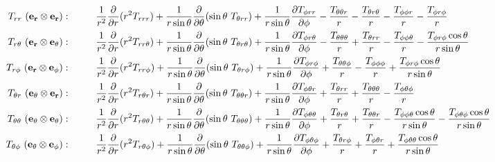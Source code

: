 \documentclass[11pt]{article}
\newcommand{\dr}{\frac{\partial}{\partial r}}
\begin{document}
\begin{landscape}
\newpage

\begin{align}
T_{rr} \ ({\bf{e_r \otimes e_r}}): & \hspace{1cm} \frac{1}{r^2}\dr (r^2 T_{rrr}) + \frac{1}{r\sin{\theta}}\frac{\partial}{\partial \theta} (\sin{\theta} \ T_{\theta rr}) + \frac{1}{r\sin{\theta}}\frac{\partial T_{\phi rr}}{\partial \phi} - \frac{T_{\theta\theta r}}{r} - \frac{T_{\theta r \theta}}{r} -\frac{T_{\phi\phi r}}{r} - \frac{T_{\phi r \phi}}{r} \\
T_{r\theta} \ ({\bf{e_r \otimes e_\theta}}): & \hspace{1cm} \frac{1}{r^2}\dr (r^2 T_{rr \theta}) + \frac{1}{r\sin{\theta}}\frac{\partial}{\partial \theta} (\sin{\theta} \ T_{\theta r \theta}) + \frac{1}{r\sin{\theta}}\frac{\partial T_{\phi r \theta}}{\partial \phi} - \frac{T_{\theta \theta \theta}}{r} + \frac{T_{\theta rr}}{r} - \frac{T_{\phi \phi \theta}}{r} - \frac{T_{\phi r \phi} \cos{\theta}}{r\sin{\theta}} \\
T_{r \phi} \ ({\bf{e_r \otimes e_\phi}}): & \hspace{1cm} \frac{1}{r^2}\dr (r^2 T_{rr \phi}) + \frac{1}{r\sin{\theta}}\frac{\partial}{\partial \theta} (\sin{\theta} \ T_{\theta r \phi}) + \frac{1}{r\sin{\theta}}\frac{\partial T_{\phi r \phi}}{\partial \phi} + \frac{T_{\theta \theta \phi}}{r} - \frac{T_{\phi \phi \phi}}{r} + \frac{T_{\phi r \phi} \cos{\theta}}{r\sin{\theta}} \\
T_{\theta r} \ ({\bf{e_\theta \otimes e_r}}): & \hspace{1cm} \frac{1}{r^2}\dr (r^2 T_{r \theta r}) + \frac{1}{r\sin{\theta}}\frac{\partial}{\partial \theta} (\sin{\theta} \ T_{\theta \theta r}) + \frac{1}{r\sin{\theta}}\frac{\partial T_{\phi \theta r}}{\partial \phi} + \frac{T_{\theta rr}}{r} + \frac{T_{\theta \theta \theta}}{r} -\frac{T_{\phi \theta \phi}}{r} \\
T_{\theta \theta} \ ({\bf{e_\theta \otimes e_\theta}}): & \hspace{1cm} \frac{1}{r^2}\dr (r^2 T_{r \theta \theta}) + \frac{1}{r\sin{\theta}}\frac{\partial}{\partial \theta} (\sin{\theta} \ T_{\theta \theta \theta}) + \frac{1}{r\sin{\theta}}\frac{\partial T_{\phi \theta \theta}}{\partial \phi} + \frac{T_{\theta r \theta}}{r} + \frac{T_{\theta \theta r}}{r} - \frac{T_{\phi \phi \theta} \cos{\theta}}{r\sin{\theta}} - \frac{T_{\phi \theta \phi} \cos{\theta}}{r\sin{\theta}} \\
T_{\theta \phi} \ ({\bf{e_\theta \otimes e_\phi}}): & \hspace{1cm} \frac{1}{r^2}\dr (r^2 T_{r \theta \phi}) + \frac{1}{r\sin{\theta}}\frac{\partial}{\partial \theta} (\sin{\theta} \ T_{\theta \theta \phi}) + \frac{1}{r\sin{\theta}}\frac{\partial T_{\phi \theta \phi}}{\partial \phi} + \frac{T_{\theta r \phi}}{r} + \frac{T_{\phi \theta r}}{r} + \frac{T_{\phi \theta \theta} \cos{\theta}}{r\sin{\theta}} \\

\end{align}
\end{landscape}
\end{document}
